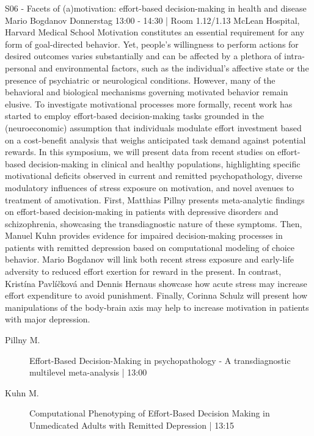 
            \begin{symposium}
            {S06 - Facets of (a)motivation: effort-based decision-making in health and disease }
            {Mario Bogdanov}
            {Donnerstag 13:00 - 14:30 | Room 1.12/1.13}
            {McLean Hospital, Harvard Medical School}
            Motivation constitutes an essential requirement for any form of goal-directed behavior. Yet, people’s willingness to perform actions for desired outcomes varies substantially and can be affected by a plethora of intra-personal and environmental factors, such as the individual’s affective state or the presence of psychiatric or neurological conditions. However, many of the behavioral and biological mechanisms governing motivated behavior remain elusive. To investigate motivational processes more formally, recent work has started to employ effort-based decision-making tasks grounded in the (neuroeconomic) assumption that individuals modulate effort investment based on a cost-benefit analysis that weighs anticipated task demand against potential rewards. In this symposium, we will present data from recent studies on effort-based decision-making in clinical and healthy populations, highlighting specific motivational deficits observed in current and remitted psychopathology, diverse modulatory influences of stress exposure on motivation, and novel avenues to treatment of amotivation. First, Matthias Pillny presents meta-analytic findings on effort-based decision-making in patients with depressive disorders and schizophrenia, showcasing the transdiagnostic nature of these symptoms. Then, Manuel Kuhn provides evidence for impaired decision-making processes in patients with remitted depression based on computational modeling of choice behavior. Mario Bogdanov will link both recent stress exposure and early-life adversity to reduced effort exertion for reward in the present. In contrast, Kristína Pavlíčková and Dennis Hernaus showcase how acute stress may increase effort expenditure to avoid punishment. Finally, Corinna Schulz will present how manipulations of the body-brain axis may help to increase motivation in patients with major depression.
            \begin{description}    
            
                \item [ Pillny M.] Effort-Based Decision-Making in psychopathology - A transdiagnostic multilevel meta-analysis \textcolor{mygray}{ | 13:00}    
                
                \item [ Kuhn M.] Computational Phenotyping of Effort-Based Decision Making in Unmedicated Adults with Remitted Depression \textcolor{mygray}{ | 13:15}    
                

\end{description}
\end{symposium}
